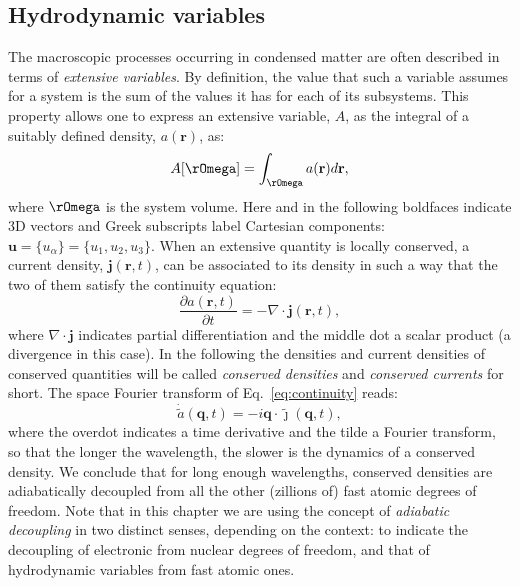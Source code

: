 \subsection{Hydrodynamic variables} \label{sec:hydrodyn_var}
The macroscopic processes occurring in condensed matter are often described in terms of \emph{extensive variables}. By definition, the value that such a variable assumes for a system is the sum of the values it has for each of its subsystems. This property allows one to express an extensive variable, $A$, as the integral of a suitably defined density, $a(\mathbf{r})$, as:
\begin{equation}
A[\rOmega]=\int_\rOmega a(\mathbf{r})d\mathbf{r}, \label{eq:extensivity}
\end{equation}
where $\rOmega$ is the system volume. Here and in the following boldfaces indicate 3D vectors and Greek subscripts label Cartesian components: $\mathbf{u}= \{u_\alpha\} = \{u_1,u_2,u_3\}$. When an extensive quantity is locally conserved, a current density, $\bm{j}(\mathbf{r},t)$, can be associated to its density in such a way that the two of them satisfy the continuity equation:
\begin{equation}
\frac{\partial a(\mathbf{r},t)}{\partial t} = - \nabla\cdot\bm{j}(\mathbf{r},t), \label{eq:continuity}
\end{equation}
where $\nabla\cdot\bm{j}$ indicates partial differentiation and the middle dot a scalar product (a divergence in this case). In the following the densities and current densities of conserved quantities will be called \emph{conserved densities} and \emph{conserved currents} for short. The space Fourier transform of Eq.~\eqref{eq:continuity} reads:
\begin{equation}
\dot{\tilde a}(\mathbf{q},t) = - i\mathbf{q} \cdot \tilde {\bm{\jmath}} (\mathbf{q},t), \label{eq:kontinuity}\end{equation}
where the overdot indicates a time derivative and the tilde a Fourier transform, so that the longer the wavelength, the slower is the dynamics of a conserved density. We conclude that for long enough wavelengths, conserved densities are adiabatically decoupled from all the other (zillions of) fast atomic degrees of freedom. Note that in this chapter we are using the concept of \emph{adiabatic decoupling} in two distinct senses, depending on the context: to indicate the decoupling of electronic from nuclear degrees of freedom, and that of hydrodynamic variables from fast atomic ones.

